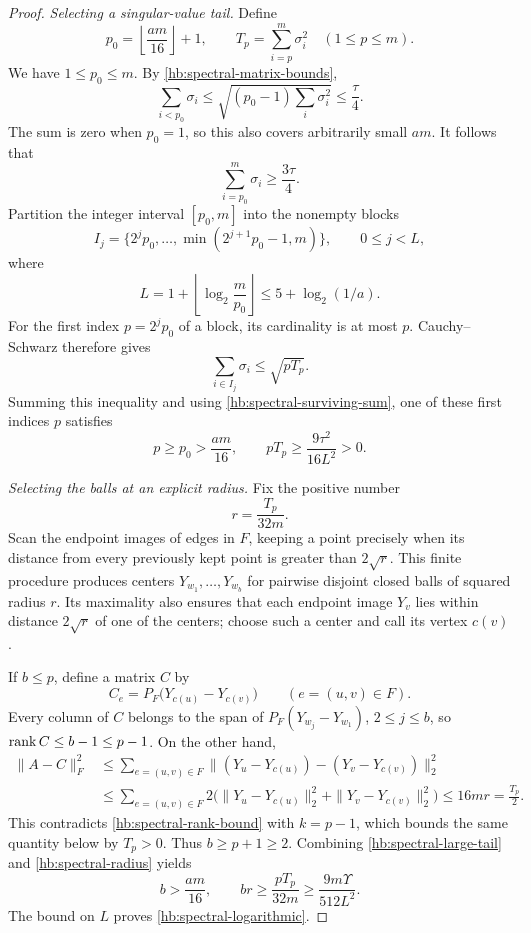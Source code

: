 \begin{proof}
\smallskip
\noindent\emph{Selecting a singular-value tail.}
Define
\[
 p_0=\left\lfloor\frac{am}{16}\right\rfloor+1,
 \qquad T_p=\sum_{i=p}^m\sigma_i^2\quad(1\le p\le m).
\]
We have \(1\le p_0\le m\).  By \eqref{hb:spectral-matrix-bounds},
\[
 \sum_{i<p_0}\sigma_i
 \le\sqrt{(p_0-1)\sum_i\sigma_i^2}
 \le\frac\tau4.
\]
The sum is zero when \(p_0=1\), so this also covers arbitrarily small
\(am\).  It follows that
\begin{equation}\label{hb:spectral-surviving-sum}
 \sum_{i=p_0}^m\sigma_i\ge\frac{3\tau}{4}.
\end{equation}
Partition the integer interval \([p_0,m]\) into the nonempty blocks
\[
 I_j=\{2^jp_0,\ldots,\min(2^{j+1}p_0-1,m)\},
 \qquad 0\le j<L,
\]
where
\[
 L=1+\left\lfloor\log_2\frac m{p_0}\right\rfloor
 \le 5+\log_2(1/a).
\]
For the first index \(p=2^jp_0\) of a block, its cardinality is at
most \(p\).  Cauchy--Schwarz therefore gives
\[
 \sum_{i\in I_j}\sigma_i\le\sqrt{pT_p}.
\]
Summing this inequality and using
\eqref{hb:spectral-surviving-sum}, one of these first indices \(p\)
satisfies
\begin{equation}\label{hb:spectral-large-tail}
 p\ge p_0>\frac{am}{16},
 \qquad
 pT_p\ge\frac{9\tau^2}{16L^2}>0.
\end{equation}

\smallskip
\noindent\emph{Selecting the balls at an explicit radius.}
Fix the positive number
\begin{equation}\label{hb:spectral-radius}
 r=\frac{T_p}{32m}.
\end{equation}
Scan the endpoint images of edges in \(F\), keeping a point precisely
when its distance from every previously kept point is greater than
\(2\sqrt r\).  This finite procedure produces centers
\(Y_{w_1},\ldots,Y_{w_b}\) for pairwise disjoint closed balls of
squared radius \(r\).  Its maximality also ensures that each endpoint
image \(Y_v\) lies within distance \(2\sqrt r\) of one of the
centers; choose such a center and call its vertex \(c(v)\).

If \(b\le p\), define a matrix \(C\) by
\[
 C_e=P_F\bigl(Y_{c(u)}-Y_{c(v)}\bigr)
 \qquad(e=(u,v)\in F).
\]
Every column of \(C\) belongs to the span of
\(P_F(Y_{w_j}-Y_{w_1})\), \(2\le j\le b\), so
\(\operatorname{rank} C\le b-1\le p-1\).  On the other hand,
\begin{align*}
 \|A-C\|_F^2
 &\le\sum_{e=(u,v)\in F}
 \bigl\|(Y_u-Y_{c(u)})-(Y_v-Y_{c(v)})\bigr\|_2^2\\
 &\le\sum_{e=(u,v)\in F}
 2\bigl(\|Y_u-Y_{c(u)}\|_2^2+
          \|Y_v-Y_{c(v)}\|_2^2\bigr)
 \le16mr=\frac{T_p}{2}.
\end{align*}
This contradicts \eqref{hb:spectral-rank-bound} with \(k=p-1\),
which bounds the same quantity below by \(T_p>0\).
Thus \(b\ge p+1\ge2\).  Combining
\eqref{hb:spectral-large-tail} and \eqref{hb:spectral-radius} yields
\[
 b>\frac{am}{16},
 \qquad
 br\ge\frac{pT_p}{32m}
 \ge\frac{9m\Upsilon}{512L^2}.
\]
The bound on \(L\) proves \eqref{hb:spectral-logarithmic}.


\end{proof}

